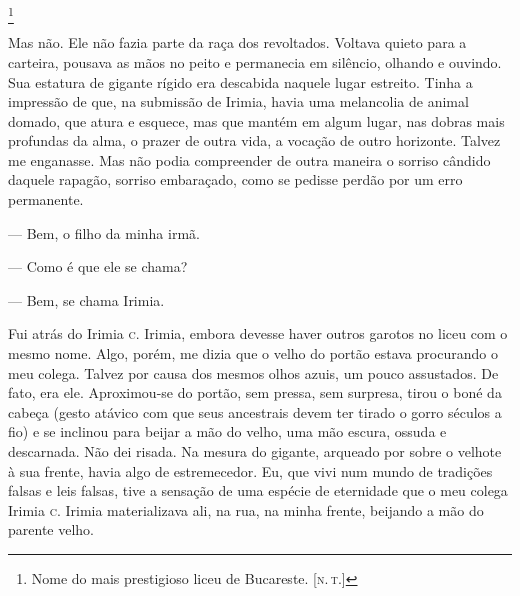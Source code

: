 \footnote{Nome do mais
  prestigioso liceu de Bucareste. {[}\textsc{n.\,t.}{]}} 

Mas não. Ele não fazia parte da raça dos revoltados. Voltava quieto para
a carteira, pousava as mãos no peito e permanecia em silêncio, olhando e
ouvindo. Sua estatura de gigante rígido era descabida naquele lugar
estreito. Tinha a impressão de que, na submissão de Irimia, havia uma
melancolia de animal domado, que atura e esquece, mas que mantém em
algum lugar, nas dobras mais profundas da alma, o prazer de outra vida,
a vocação de outro horizonte. Talvez me enganasse. Mas não podia
compreender de outra maneira o sorriso cândido daquele rapagão, sorriso
embaraçado, como se pedisse perdão por um erro permanente.\label{erro}



--- Bem, o filho da minha irmã.

--- Como é que ele se chama?

--- Bem, se chama Irimia.

Fui atrás do Irimia \textsc{c}. Irimia, embora devesse haver outros garotos no
liceu com o mesmo nome. Algo, porém, me dizia que o velho do portão
estava procurando o meu colega. Talvez por causa dos mesmos olhos azuis,
um pouco assustados. De fato, era ele. Aproximou-se do portão, sem
pressa, sem surpresa, tirou o boné da cabeça (gesto atávico com que seus
ancestrais devem ter tirado o gorro séculos a fio) e se inclinou para
beijar a mão do velho, uma mão escura, ossuda e descarnada. Não dei
risada. Na mesura do gigante, arqueado por sobre o velhote à sua frente,
havia algo de estremecedor. Eu, que vivi num mundo de tradições falsas e
leis falsas, tive a sensação de uma espécie de eternidade que o meu
colega Irimia \textsc{c}. Irimia materializava ali, na rua, na minha frente,
beijando a mão do parente velho.\label{velho}

